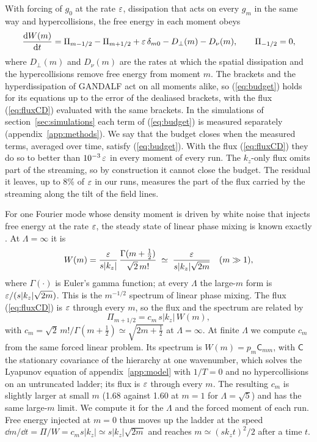 With forcing of $g_0$ at the rate $\varepsilon$, dissipation that acts on every $g_m$ in the same way and hypercollisions, the free energy in each moment obeys
\begin{equation}\label{eq:budget}
  \frac{\mathrm{d} W(m)}{\mathrm{d} t}=\Pi_{m-1/2}-\Pi_{m+1/2}+\varepsilon\,\delta_{m0}-D_\perp(m)-D_\nu(m),\qquad \Pi_{-1/2}=0,
\end{equation}
where $D_\perp(m)$ and $D_\nu(m)$ are the rates at which the spatial dissipation and the hypercollisions remove free energy from moment $m$. The brackets and the hyperdissipation of GANDALF act on all moments alike, so (\ref{eq:budget}) holds for its equations up to the error of the dealiased brackets, with the flux (\ref{eq:fluxCD}) evaluated with the same brackets. In the simulations of section~\ref{sec:simulations} each term of (\ref{eq:budget}) is measured separately (appendix~\ref{app:methods}). We say that the budget closes when the measured terms, averaged over time, satisfy (\ref{eq:budget}). With the flux (\ref{eq:fluxCD}) they do so to better than $10^{-3}\,\varepsilon$ in every moment of every run. The $k_z$-only flux omits part of the streaming, so by construction it cannot close the budget. The residual it leaves, up to 8\% of $\varepsilon$ in our runs, measures the part of the flux carried by the streaming along the tilt of the field lines.

For one Fourier mode whose density moment is driven by white noise that injects free energy at the rate $\varepsilon$, the steady state of linear phase mixing is known exactly \citep[eq.~4.10]{Kanekar2015}. At $\Lambda=\infty$ it is
\begin{equation}\label{eq:linforced}
  W(m)=\frac{\varepsilon}{s|k_z|}\,\frac{\Gamma(m+\frac12)}{\sqrt2\,m!}\;\simeq\;\frac{\varepsilon}{s|k_z|\sqrt{2m}}\quad(m\gg1),
\end{equation}
where $\Gamma(\cdot)$ is Euler's gamma function; at every $\Lambda$ the large-$m$ form is $\varepsilon/(s|k_z|\sqrt{2m})$. This is the $m^{-1/2}$ spectrum of linear phase mixing. The flux (\ref{eq:fluxCD}) is $\varepsilon$ through every $m$, so the flux and the spectrum are related by
\begin{equation}\label{eq:cm}
  \Pi_{m+1/2}=c_m\,s|k_z|\,W(m),
\end{equation}
with $c_m=\sqrt2\,m!/\Gamma(m+\frac12)\simeq\sqrt{2m+\frac12}$ at $\Lambda=\infty$. At finite $\Lambda$ we compute $c_m$ from the same forced linear problem. Its spectrum is $W(m)=p_m\mathsf C_{mm}$, with $\mathsf C$ the stationary covariance of the hierarchy at one wavenumber, which solves the Lyapunov equation of appendix~\ref{app:model} with $1/T=0$ and no hypercollisions on an untruncated ladder; its flux is $\varepsilon$ through every $m$. The resulting $c_m$ is slightly larger at small $m$ (1.68 against 1.60 at $m=1$ for $\Lambda=\sqrt5$) and has the same large-$m$ limit. We compute it for the $\Lambda$ and the forced moment of each run. Free energy injected at $m=0$ thus moves up the ladder at the speed $\dd m/\dd t=\Pi/W=c_ms|k_z|\simeq s|k_z|\sqrt{2m}$ and reaches $m\simeq(sk_zt)^2/2$ after a time $t$.
